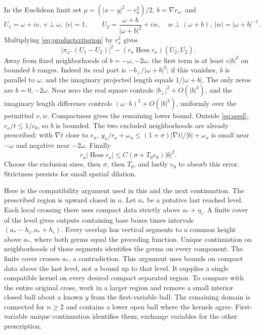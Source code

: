 \documentclass[11pt]{article}
\theoremstyle{definition}\newtheorem{definition}[theorem]{Definition}
\theoremstyle{remark}\newtheorem{remark}[theorem]{Remark}
\newcommand{\Hess}{\operatorname{Hess}}
\begin{document}
In the Euclidean limit set $\rho=(|x-y|^2-r_a^2)/2$, $b=\nabla r_a$, and
\[
 U_1=\omega+iv,\ v\perp\omega,\ |v|=1,\qquad
 U_2=\frac{\omega+b}{|\omega+b|^2}+iw,\quad
 w\perp(\omega+b),\ |w|=|\omega+b|^{-1}.
\]
Multiplying \eqref{eq:productcriterion} by $r_a^2$ gives
\begin{equation}\label{eq:tubetest}
 |\pi_{\omega^\perp}(U_1-U_2)|^2
       -(r_a\Hess r_a)(U_2,\overline{U_2}).
\end{equation}
Away from fixed neighborhoods of $b=-\omega,-2\omega$, the first term
is at least $c|b|^2$ on bounded $b$ ranges. Indeed its real part is
$-b_\perp/|\omega+b|^2$; if this vanishes, $b$ is parallel to $\omega$,
and the imaginary projected length equals $1/|\omega+b|$. The only
zeros are $b=0,-2\omega$. Near zero the real square controls
$|b_\perp|^2+O(|b|^3)$, and the imaginary length difference controls
$(\omega\cdot b)^2+O(|b|^3)$, uniformly over the permitted $v,w$.
Compactness gives the remaining lower bound.
Outside \eqref{eq:seed}, $r_a/t\le1/c_0$, so $b$ is bounded.
The two excluded neighborhoods are already prescribed: with
$\nabla t$ close to $e_n$,
$y_n/r_a+\omega_n\le(1+\sigma)|\nabla t|/|b|+\omega_n$
is small near $-\omega$ and negative near $-2\omega$.
Finally
\[
 r_a|\Hess r_a|\le C(\sigma+T_0e_0)|b|^2.
\]
Choose the exclusion sizes, then $\sigma$, then $T_0$, and lastly $e_0$
to absorb this error. Strictness persists for small spatial dilation.

Here is the compatibility argument used in this and the next continuation.
The prescribed region is upward closed in $a$. Let $a_*$ be a putative
last reached level. Each local crossing there uses compact data strictly
above $a_*+\eta_i$. A finite cover of the level gives outputs containing
base boxes times intervals $(a_*-h_i,a_*+h_i)$.
Every overlap has vertical segments to a common height above $a_*$,
where both germs equal the preceding function. Unique continuation on
neighborhoods of these segments identifies the germs on every component.
The finite cover crosses $a_*$, a contradiction. This argument uses bounds
on compact data above the last level, not a bound up to that level.
It supplies a single compatible kernel on every desired compact separated
region. To compare with the entire original cross, work in a larger region
and remove a small interior closed ball about a known $y$ from the
first-variable ball. The remaining domain is connected for $n\ge2$ and
contains a lower open ball where the kernels agree. First-variable unique
continuation identifies them; exchange variables for the other prescription.
\end{document}
